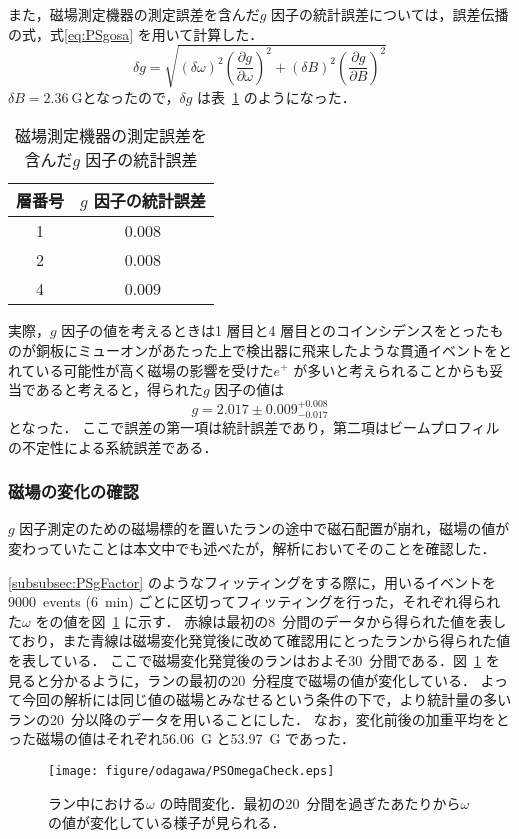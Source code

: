 また，磁場測定機器の測定誤差を含んだ$g$ 因子の統計誤差については，誤差伝播の式，式\eqref{eq:PSgosa} を用いて計算した．
\begin{equation}
\delta g = \sqrt{\left(\delta\omega\right)^{2}\left(\frac{\partial g}{\partial\omega}\right)^{2} + \left(\delta B\right)^{2}\left(\frac{\partial g}{\partial B}\right)^{2}}
\label{eq:PSgosa}
\end{equation}%
$\delta B = 2.36~\mathrm{G}$となったので，$\delta g$ は表~\ref{tab:PSgStatErr} のようになった．
\begin{table}
	\centering
	\caption{磁場測定機器の測定誤差を含んだ$g$ 因子の統計誤差}
	\begin{tabular}{cc}\toprule
	層番号 & $g$ 因子の統計誤差\\ \midrule
	1 & 0.008 \\ 
	2 & 0.008 \\
	4 & 0.009 \\ \bottomrule
	\end{tabular}\label{tab:PSgStatErr}
\end{table}%

実際，$g$ 因子の値を考えるときは1 層目と4 層目とのコインシデンスをとったものが銅板にミューオンがあたった上で検出器に飛来したような貫通イベントをとれている可能性が高く磁場の影響を受けた$e^{+}$ が多いと考えられることからも妥当であると考えると，得られた$g$ 因子の値は
\[g = 2.017 \pm 0.009 ^{+0.008}_{-0.017}\]
となった．
ここで誤差の第一項は統計誤差であり，第二項はビームプロフィルの不定性による系統誤差である．

\subsubsection{磁場の変化の確認}
\label{subsubsec:PSMagChangeCheck}

$g$ 因子測定のための磁場標的を置いたランの途中で磁石配置が崩れ，磁場の値が変わっていたことは本文中でも述べたが，解析においてそのことを確認した．

\ref{subsubsec:PSgFactor} のようなフィッティングをする際に，用いるイベントを9000~events (6~min) ごとに区切ってフィッティングを行った，それぞれ得られた$\omega$ をの値を図~\ref{fig:PSOmegaCheck} に示す．
赤線は最初の8~分間のデータから得られた値を表しており，また青線は磁場変化発覚後に改めて確認用にとったランから得られた値を表している．
ここで磁場変化発覚後のランはおよそ30~分間である．図~\ref{fig:PSOmegaCheck} を見ると分かるように，ランの最初の20~分程度で磁場の値が変化している．
よって今回の解析には同じ値の磁場とみなせるという条件の下で，より統計量の多いランの20~分以降のデータを用いることにした．
なお，変化前後の加重平均をとった磁場の値はそれぞれ56.06~G と53.97~G であった．
\begin{figure}[h]
	\centering
	\texttt{[image: figure/odagawa/PSOmegaCheck.eps]}
	\caption{ラン中における$\omega$ の時間変化．最初の20~分間を過ぎたあたりから$\omega$ の値が変化している様子が見られる．}
	\label{fig:PSOmegaCheck}
\end{figure}


